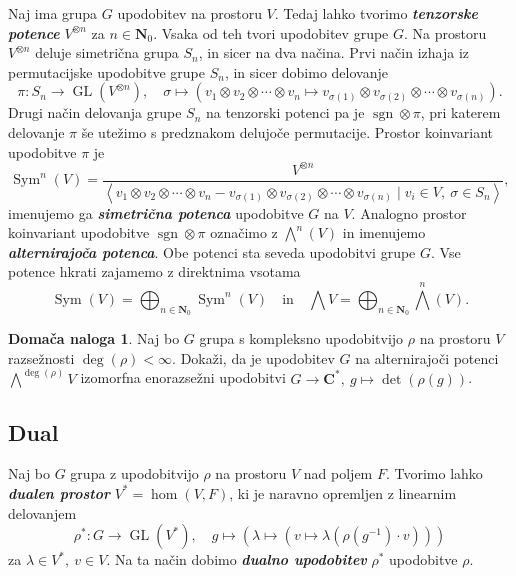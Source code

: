 \documentclass[11pt]{book}
\def\NN{\mathbf{N}}
\def\CC{\mathbf{C}}
\DeclareMathOperator\sgn{sgn}
\DeclareMathOperator\GL{GL}
\DeclareMathOperator\Sym{Sym}
\def\definicija{\color{rdeca}\bf\em}
\theoremstyle{definition}
\theoremstyle{zgled}
\theoremstyle{odprtproblem}
\theoremstyle{domacanaloga}
\newtheorem*{domacanaloga}{Domača naloga}
\theoremstyle{izrek}
\begin{document}
Naj ima grupa $G$ upodobitev na prostoru $V$. Tedaj lahko tvorimo {\definicija tenzorske potence} $V^{\otimes n}$ za $n \in \NN_0$. Vsaka od teh tvori upodobitev grupe $G$. Na prostoru $V^{\otimes n}$ deluje simetrična grupa $S_n$, in sicer na dva načina. Prvi način izhaja iz permutacijske upodobitve grupe $S_n$, in sicer dobimo delovanje
\[
    \pi \colon S_n \to \GL(V^{\otimes n}), \quad
    \sigma \mapsto \left( v_1 \otimes v_2 \otimes \cdots \otimes v_n \mapsto  v_{\sigma(1)} \otimes v_{\sigma(2)} \otimes \cdots \otimes v_{\sigma(n)} \right).
\]
Drugi način delovanja grupe $S_n$ na tenzorski potenci pa je $\sgn \otimes \pi$, pri katerem delovanje $\pi$ še utežimo s predznakom delujoče permutacije. Prostor koinvariant upodobitve $\pi$ je
\[
    {\textstyle \Sym^n(V)} =
    \frac{V^{\otimes n}}{
        \left\langle v_1 \otimes v_2 \otimes \cdots \otimes v_n -  v_{\sigma(1)} \otimes v_{\sigma(2)} \otimes \cdots \otimes v_{\sigma(n)} \mid v_i \in V, \ \sigma \in S_n \right\rangle
    },
\]
imenujemo ga {\definicija simetrična potenca} upodobitve $G$ na $V$. Analogno prostor koinvariant upodobitve $\sgn \otimes \pi$ označimo z $\bigwedge^n(V)$ in imenujemo {\definicija alternirajoča potenca}. Obe potenci sta seveda upodobitvi grupe $G$. Vse potence hkrati zajamemo z direktnima vsotama
\[
    \textstyle \Sym(V) = \bigoplus_{n \in \NN_0} \Sym^n(V) 
    \quad \text{in} \quad
    \bigwedge V = \bigoplus_{n \in \NN_0} \textstyle\bigwedge^n(V).
\]

\begin{domacanaloga}
Naj bo $G$ grupa s kompleksno upodobitvijo $\rho$ na prostoru $V$ razsežnosti $\deg(\rho) < \infty$. Dokaži, da je upodobitev $G$ na alternirajoči potenci $\bigwedge^{\deg(\rho)} V$ izomorfna enorazsežni upodobitvi $G \to \CC^*, \ g \mapsto \det(\rho(g))$.
\end{domacanaloga}

\subsection{Dual}

Naj bo $G$ grupa z upodobitvijo $\rho$ na prostoru $V$ nad poljem $F$. Tvorimo lahko {\definicija dualen prostor} $V^* = \hom(V, F)$, ki je naravno opremljen z linearnim delovanjem
\[
    \rho^* \colon G \to \GL(V^*), \quad
    g \mapsto \left( \lambda \mapsto \left( v \mapsto \lambda(\rho(g^{-1}) \cdot v) \right) \right)
\]
za $\lambda \in V^*, \ v \in V$. Na ta način dobimo {\definicija dualno upodobitev} $\rho^*$ upodobitve $\rho$. 
\end{document}
